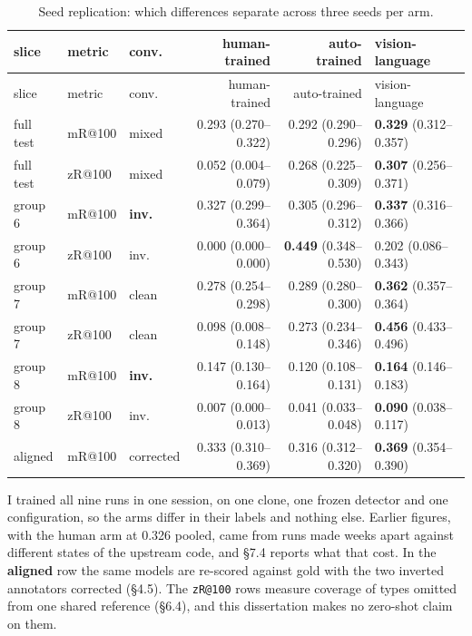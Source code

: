 \begin{center}
\setlength{\tabcolsep}{2pt}
\footnotesize
\begin{longtable}{lllrrl}
\caption[Seed replication]{Seed replication: which differences separate across three seeds per arm.}\\
\hline
slice & metric & conv. & human-trained & auto-trained & vision-language \\
\hline
\endfirsthead
\hline
slice & metric & conv. & human-trained & auto-trained & vision-language \\
\hline
\endhead
full test & mR@100 & mixed & 0.293 (0.270--0.322) & 0.292 (0.290--0.296) & \textbf{0.329} (0.312--0.357) \\
full test & zR@100 & mixed & 0.052 (0.004--0.079) & 0.268 (0.225--0.309) & \textbf{0.307} (0.256--0.371) \\
group 6 & mR@100 & \textbf{inv.} & 0.327 (0.299--0.364) & 0.305 (0.296--0.312) & \textbf{0.337} (0.316--0.366) \\
group 6 & zR@100 & inv. & 0.000 (0.000--0.000) & \textbf{0.449} (0.348--0.530) & 0.202 (0.086--0.343) \\
group 7 & mR@100 & clean & 0.278 (0.254--0.298) & 0.289 (0.280--0.300) & \textbf{0.362} (0.357--0.364) \\
group 7 & zR@100 & clean & 0.098 (0.008--0.148) & 0.273 (0.234--0.346) & \textbf{0.456} (0.433--0.496) \\
group 8 & mR@100 & \textbf{inv.} & 0.147 (0.130--0.164) & 0.120 (0.108--0.131) & \textbf{0.164} (0.146--0.183) \\
group 8 & zR@100 & inv. & 0.007 (0.000--0.013) & 0.041 (0.033--0.048) & \textbf{0.090} (0.038--0.117) \\
aligned & mR@100 & corrected & 0.333 (0.310--0.369) & 0.316 (0.312--0.320) & \textbf{0.369} (0.354--0.390) \\
\hline
\end{longtable}
\end{center}

I trained all nine runs in one session, on one clone, one frozen detector and one configuration, so the arms differ in their labels and nothing else. Earlier figures, with the human arm at 0.326 pooled, came from runs made weeks apart against different states of the upstream code, and \S{}7.4 reports what that cost. In the \textbf{aligned} row the same models are re-scored against gold with the two inverted annotators corrected (\S{}4.5). The \texttt{zR@100} rows measure coverage of types omitted from one shared reference (\S{}6.4), and this dissertation makes no zero-shot claim on them.

